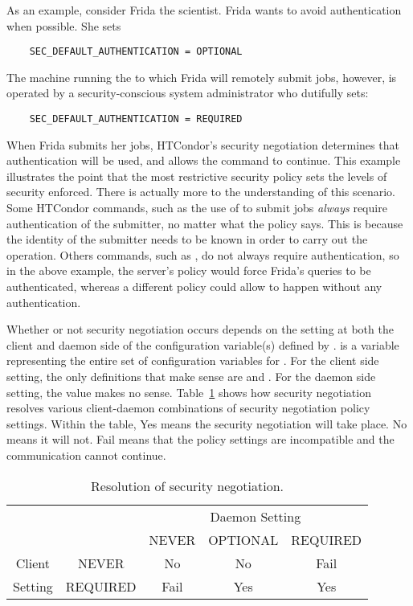 As an example, consider Frida the scientist.
Frida wants to avoid authentication when possible.
She sets
\begin{verbatim}
    SEC_DEFAULT_AUTHENTICATION = OPTIONAL
\end{verbatim}
The machine running the 
to which Frida will remotely submit jobs,
however,
is operated by a security-conscious system administrator who dutifully
sets:
\begin{verbatim}
    SEC_DEFAULT_AUTHENTICATION = REQUIRED
\end{verbatim}
When Frida submits her jobs, HTCondor's security negotiation determines
that authentication will be used, and allows the command to continue.
This example illustrates the point that the most restrictive
security policy sets the levels of security enforced.
There is actually more to the understanding of this scenario.
Some HTCondor commands, such as the use of 
to submit jobs \emph{always} require
authentication of the submitter, no matter what the policy says. 
This is because the identity
of the submitter needs to be known in order to carry out the operation.
Others commands, such as , do not always require
authentication, so in the above example, the server's policy would
force Frida's  queries to be authenticated, whereas a different
policy could allow  to happen without any authentication.


Whether or not security negotiation occurs depends on the
setting at both the client and daemon side of the 
configuration variable(s) defined by .
 is a variable representing
the entire set of configuration variables for .
For the client side setting,
the only definitions that make sense are  and .
For the daemon side setting,
the  value makes no sense.
Table~\ref{table:Sec-Negotiation} shows how security negotiation
resolves various client-daemon combinations of security negotiation policy
settings.
Within the table, Yes means the security negotiation will take place.
No means it will not.
Fail means that the policy settings are incompatible and the communication
cannot continue.

\begin{table}[tb]
\centering
\begin{tabular}{|c|c|c|c|c|}
  \hline
  \multicolumn{2}{|c|}{\hfill} & \multicolumn{3}{c|}{Daemon Setting} \\
  \cline{3-5}
  \multicolumn{2}{|c|}{\hfill} & NEVER & OPTIONAL & REQUIRED \\
  \hline
  \cline{2-5}
  Client & NEVER & No & No & Fail \\
  \cline{2-5}
  Setting & REQUIRED & Fail & Yes & Yes \\
  \hline
\end{tabular}
\caption{\label{table:Sec-Negotiation}Resolution of security negotiation.  }
\end{table}


